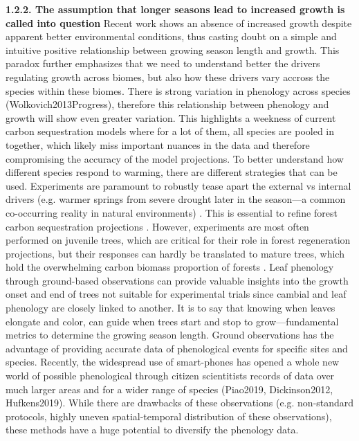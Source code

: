 \documentclass{article}
\begin{document}
\textbf{1.2.2. The assumption that longer seasons lead to increased growth is called into question}
Recent work shows an absence of increased growth despite apparent better environmental conditions, thus casting doubt on a simple and intuitive positive relationship between growing season length and growth. This paradox further emphasizes that we need to understand better the drivers regulating growth across biomes, but also how these drivers vary accross the species within these biomes. There is strong variation in phenology across species (Wolkovich2013Progress), therefore this relationship between phenology and growth will show even greater variation. %
This highlights a weekness of current carbon sequestration models where for a lot of them, all species are pooled in together, which likely miss important nuances in the data and therefore compromising the accuracy of the model projections. To better understand how different species respond to warming, there are different strategies that can be used. Experiments are paramount to robustly tease apart the external vs internal drivers (e.g. warmer springs from severe drought later in the season---a common co-occurring reality in natural environments) \cite{morin_changes_2010,primack_observations_2015}. This is essential to refine forest carbon sequestration projections \cite{green_limits_2022,cabon_cross-biome_2022}. However, experiments are most often performed on juvenile trees, which are critical for their role in forest regeneration projections, but their responses can hardly be translated to mature trees, which hold the overwhelming carbon biomass proportion of forests \cite{augspurger_differences_2003,silvestro_longer_2023,vitasse_ontogenic_2013}. Leaf phenology through ground-based observations can provide valuable insights into the growth onset and end of trees not suitable for experimental trials since cambial and leaf phenology are closely linked to another. It is to say that knowing when leaves elongate and color, can guide when trees start and stop to grow---fundamental metrics to determine the growing season length. Ground observations has the advantage of providing accurate data of phenological events for specific sites and species. Recently, the widespread use of smart-phones has opened a whole new world of possible phenological through citizen scientitists records of data over much larger areas and for a wider range of species (Piao2019, Dickinson2012, Hufkens2019). While there are drawbacks of these observations (e.g. non-standard protocols, highly uneven spatial-temporal distribution of these observations), these methods have a huge potential to diversify the phenology data. %
\end{document}
